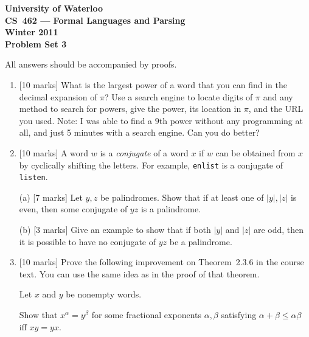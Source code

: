 \documentclass[12pt]{article}
\begin{document}
\begin{center}
\large\bf University of Waterloo\\
CS~462 --- Formal Languages and Parsing\\
Winter 2011\\
Problem Set 3\\
\end{center}

\bigskip


\smallskip


\bigskip\bigskip

All answers should be accompanied by proofs.

\begin{enumerate}

\item{} [10 marks]
What is the largest power of a word
that you can find in the decimal expansion of $\pi$?  Use a search
engine to locate digits of $\pi$ and any method to search for powers,
give the power, its location in $\pi$, and the URL you used.
Note:  I was able to find a $9$th power without any programming at
all, and just 5 minutes with a search engine.  Can you do better?


\item{} [10 marks]
A word $w$ is a {\it conjugate} of a word $x$ if $w$ can be obtained
from $x$ by cyclically shifting the letters.  For example,
{\tt enlist} is a conjugate of {\tt listen}.

(a) [7 marks] Let $y, z$ be palindromes.  Show that if at least
one of $|y|, |z|$ is even, then some conjugate of $yz$ is a palindrome.

(b) [3 marks] Give an example to show that
if both $|y|$ and $|z|$ are odd, then it is possible to have no
conjugate of $yz$ be a palindrome.

\item{} [10 marks]   Prove the following improvement on Theorem~2.3.6
in the course text.  You can use the same idea as in the proof of
that theorem.

Let $x$ and $y$ be nonempty words.

Show that 
$x^\alpha = y^\beta$ 
for some fractional exponents $\alpha, \beta$ satisfying
$\alpha + \beta \leq \alpha \beta$ iff 
$xy = yx$.


\end{enumerate}
\end{document}
